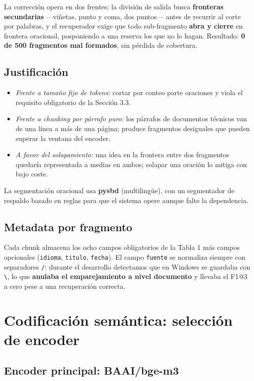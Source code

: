 \documentclass[10pt,a4paper]{article}
\begin{document}
La corrección opera en dos frentes: la división de salida busca \textbf{fronteras secundarias}
—viñetas, punto y coma, dos puntos— antes de recurrir al corte por palabras, y el recuperador exige
que todo sub-fragmento \textbf{abra y cierre} en frontera oracional, posponiendo a una reserva los
que no lo hagan. Resultado: \textbf{0 de 500 fragmentos mal formados}, sin pérdida de cobertura.

\subsection{Justificación}

\begin{itemize}
\item \emph{Frente a tamaño fijo de tokens:} cortar por conteo parte oraciones y viola el
requisito obligatorio de la Sección 3.3.
\item \emph{Frente a chunking por párrafo puro:} los párrafos de documentos técnicos van de una
línea a más de una página; produce fragmentos desiguales que pueden superar la ventana del encoder.
\item \emph{A favor del solapamiento:} una idea en la frontera entre dos fragmentos quedaría
representada a medias en ambos; solapar una oración lo mitiga con bajo coste.
\end{itemize}

La segmentación oracional usa \textbf{pysbd} (multilingüe), con un segmentador de respaldo basado
en reglas para que el sistema opere aunque falte la dependencia.

\subsection{Metadata por fragmento}

Cada chunk almacena los ocho campos obligatorios de la Tabla 1 más campos opcionales
(\texttt{idioma}, \texttt{titulo}, \texttt{fecha}). El campo \texttt{fuente} se normaliza siempre
con separadores \texttt{/}: durante el desarrollo detectamos que en Windows se guardaba con
\texttt{\textbackslash}, lo que \textbf{anulaba el emparejamiento a nivel documento} y llevaba el
F1@3 a cero pese a una recuperación correcta.

\section{Codificación semántica: selección de encoder}

\subsection{Encoder principal: BAAI/bge-m3}
\end{document}
